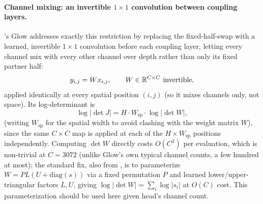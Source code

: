 \paragraph{Channel mixing: an invertible \texorpdfstring{$1\times1$}{1x1} convolution between coupling
layers.} \cite{kingma2018glow}'s Glow addresses exactly this restriction by replacing the fixed-half-swap
with a learned, invertible $1\times1$ convolution before each coupling layer, letting every channel mix
with every other channel over depth rather than only its fixed partner half:
\begin{equation}
y_{i,j} = W x_{i,j},\qquad W\in\mathbb{R}^{C\times C}\ \text{invertible},
\label{eq:inv1x1}
\end{equation}
applied identically at every spatial position $(i,j)$ (so it mixes channels only, not space). Its
log-determinant is
\begin{equation}
\log\bigl|\det J\bigr| = H\cdot W_{\mathrm{sp}}\cdot\log\bigl|\det W\bigr|,
\label{eq:inv1x1-logdet}
\end{equation}
(writing $W_{\mathrm{sp}}$ for the spatial width to avoid clashing with the weight matrix $W$), since the
same $C\times C$ map is applied at each of the $H\times W_{\mathrm{sp}}$ positions independently. Computing
$\det W$ directly costs $O(C^3)$ per evaluation, which is non-trivial at $C=3072$ (unlike Glow's own typical
channel counts, a few hundred at most); the standard fix, also from \cite{kingma2018glow}, is to
parameterize $W=PL(U+\mathrm{diag}(s))$ via a fixed permutation $P$ and learned lower/upper-triangular
factors $L,U$, giving $\log|\det W|=\sum_i\log|s_i|$ at $O(C)$ cost. This parameterization should be used
here given head's channel count.

